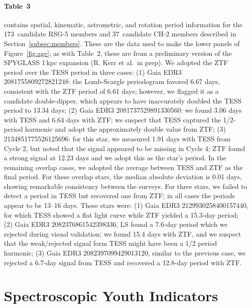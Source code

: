 \documentclass[12pt,twocolumn]{aastex63}
\newcommand{\nchtwo}{37} %
\newcommand{\nrsgfive}{173} %
\begin{document}
\paragraph{Table~3} contains spatial, kinematic, astrometric, and
rotation period information for the \nrsgfive\ candidate RSG-5 members
and \nchtwo\ candidate CH-2 members described in
Section~\ref{subsec:members}.  These are the data used to make the
lower panels of Figure~\ref{fig:age}; as with Table~2, these are
from a preliminary version of the SPYGLASS 1\,kpc expansion (R. Kerr et
al.\ in prep). 
We adopted the ZTF period over the
TESS period in three cases: (1) Gaia EDR3 2081755809272821248: the
Lomb-Scargle periodogram favored 6.67 days, consistent with the ZTF
period of 6.61 days; however, we flagged it as a candidate
double-dipper, which appears to have inaccurately doubled the TESS
period to 13.34 days; (2) Gaia EDR3 2081737529891330560: we found 3.06
days with TESS and 6.64 days with ZTF; we suspect that TESS captured
the 1/2-period harmonic and adopt the approximately double value from
ZTF; (3) 2134851775526125696: for this star, we measured 1.91 days
with TESS from Cycle 2, but noted that the signal appeared to be
missing in Cycle 4; ZTF found a strong signal at 12.23 days and we
adopt this as the star's period. In the remaining overlap cases, we
adopted the average between TESS and ZTF as the final period. For
these overlap stars, the median absolute deviation is 0.01 days,
showing remarkable consistency between the surveys. For three stars,
we failed to detect a period in TESS but recovered one from ZTF; in
all cases the periods appear to be 13--16 days.  These stars were: (1)
Gaia EDR3 2129930258400157440, for which TESS showed a flat light
curve while ZTF yielded a 15.3-day period; (2) Gaia EDR3
2082376861542398336, LS found a 7.6-day period which we rejected
during visual validation; we found 15.4 days with ZTF, and we suspect
that the weak/rejected signal form TESS might have been a 1/2 period
harmonic; (3) Gaia EDR3 2082397099429013120, similar to the previous
case, we rejected a 6.7-day signal from TESS and recovered a 12.8-day
period with ZTF. 


\section{Spectroscopic Youth Indicators}
\label{app:spectra}
\end{document}
